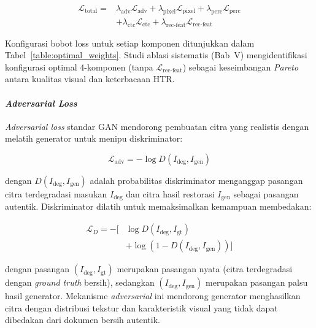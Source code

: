 \begin{equation}
  \begin{split}
    \mathcal{L}_{\text{total}} = &\lambda_{\text{adv}}\mathcal{L}_{\text{adv}} + \lambda_{\text{pixel}}\mathcal{L}_{\text{pixel}} + \lambda_{\text{perc}}\mathcal{L}_{\text{perc}} \\
    &+ \lambda_{\text{ctc}}\mathcal{L}_{\text{ctc}} + \lambda_{\text{rec-feat}}\mathcal{L}_{\text{rec-feat}}
  \end{split}
  \label{eq:IV.12}
\end{equation}

Konfigurasi bobot loss untuk setiap komponen ditunjukkan dalam Tabel~\ref{table:optimal_weights}. Studi ablasi sistematis (Bab~V) mengidentifikasi konfigurasi optimal 4-komponen (tanpa $\mathcal{L}_{\text{rec-feat}}$) sebagai keseimbangan \textit{Pareto} antara kualitas visual dan keterbacaan HTR.

\paragraph{\textit{Adversarial Loss}}

\textit{Adversarial loss} standar GAN mendorong pembuatan citra yang realistis dengan melatih generator untuk menipu diskriminator:

\begin{equation}
  \mathcal{L}_{\text{adv}} = -\log D(I_{\text{deg}}, I_{\text{gen}})
  \label{eq:IV.13}
\end{equation}

dengan $D(I_{\text{deg}}, I_{\text{gen}})$ adalah probabilitas diskriminator menganggap pasangan citra terdegradasi masukan $I_{\text{deg}}$ dan citra hasil restorasi $I_{\text{gen}}$ sebagai pasangan autentik. Diskriminator dilatih untuk memaksimalkan kemampuan membedakan:

\begin{equation}
  \begin{split}
    \mathcal{L}_D = -[&\log D(I_{\text{deg}}, I_{\text{gt}}) \\
    &+ \log(1 - D(I_{\text{deg}}, I_{\text{gen}}))]
  \end{split}
  \label{eq:IV.14}
\end{equation}

dengan pasangan $(I_{\text{deg}}, I_{\text{gt}})$ merupakan pasangan nyata (citra terdegradasi dengan \textit{ground truth} bersih), sedangkan $(I_{\text{deg}}, I_{\text{gen}})$ merupakan pasangan palsu hasil generator. Mekanisme \textit{adversarial} ini mendorong generator menghasilkan citra dengan distribusi tekstur dan karakteristik visual yang tidak dapat dibedakan dari dokumen bersih autentik.

